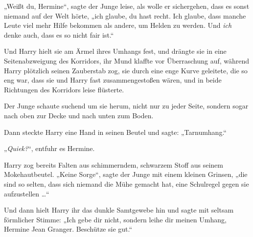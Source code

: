 „Weißt du, Hermine“, sagte der Junge leise, als wolle er sichergehen, dass es sonst niemand auf der Welt hörte, „ich glaube, du hast recht. Ich glaube, dass manche Leute viel mehr Hilfe bekommen als andere, um Helden zu werden. Und \emph{ich} denke auch, dass es so nicht fair ist.“

Und Harry hielt sie am Ärmel ihres Umhangs fest, und drängte sie in eine Seitenabzweigung des Korridors, ihr Mund klaffte vor Überraschung auf, während Harry plötzlich seinen Zauberstab zog, sie durch eine enge Kurve geleitete, die so eng war, dass sie und Harry fast zusammengestoßen wären, und in beide Richtungen des Korridors leise  flüsterte.

Der Junge schaute suchend um sie herum, nicht nur zu jeder Seite, sondern sogar nach oben zur Decke und nach unten zum Boden.

Dann steckte Harry eine Hand in seinen Beutel und sagte:
„Tarnumhang.“

„\emph{Quiek?}“, entfuhr es Hermine.

Harry zog bereits Falten aus schimmerndem, schwarzem Stoff aus seinem Mokehautbeutel.
„Keine Sorge“, sagte der Junge mit einem kleinen Grinsen, „die sind so selten, dass sich niemand die Mühe gemacht hat, eine Schulregel gegen sie aufzustellen …“

Und dann hielt Harry ihr das dunkle Samtgewebe hin und sagte mit seltsam förmlicher Stimme:
„Ich gebe dir nicht, sondern leihe dir meinen Umhang, Hermine Jean Granger. Beschütze sie gut.“

